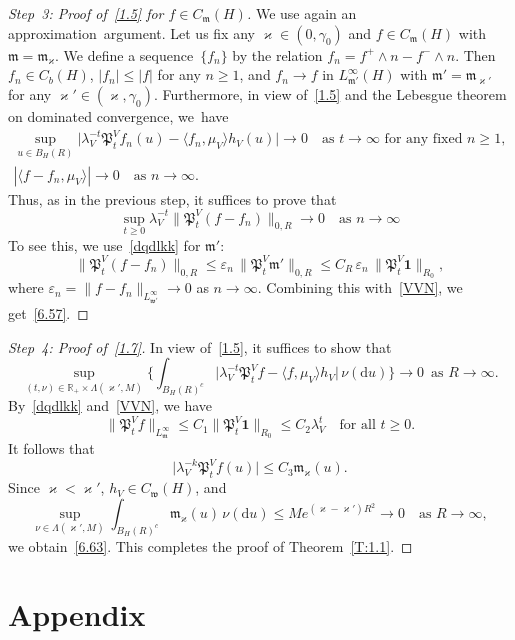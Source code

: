 \documentclass[AHL,Unicode,longabstracts]{cedram}
\newcommand{\e}{\varepsilon}
\newcommand{\mek}{{\mathbf 1}}
\newcommand{\R}{{\mathbb R}}
\newcommand{\vk}{{\varkappa}}
\newcommand{\wwww}{{\mathfrak w}}
\newcommand{\mm}{{\mathfrak m}}
\newcommand{\PPPP}{{\mathfrak P}}
\newcommand{\dd}{\mathrm{d}}
\newenvironment{step}{\begin{proof}}{\let\qed\relax \end{proof}}
\begin{document}
\begin{step}[Step~3: Proof of~\eqref{1.5} for $f\in C_\mm(H)$]
We use again an approximation~argument. Let us fix any $\vk\in(0,\gamma_0)$ and $f\in C_{\mm}(H)$ with $\mm=\mm_\vk$. We define a sequence~$\{f_n\}$ by the relation $f_n=f^+\wedge n-f^-\wedge n$. Then $f_n\in C_b(H)$, $|f_n|\le |f|$ for any $n\ge1$, and $f_n\to f$ in $L_{\mm'}^\infty(H)$ with $\mm'=\mm_{\vk'}$ for any $\vk'\in(\vk,\gamma_0)$. Furthermore, in view of~\eqref{1.5} and the Lebesgue theorem on dominated convergence, we~have
\begin{gather*}
\sup_{u\in B_H(R)}\bigl|\lambda_V^{-t}\PPPP_t^Vf_n(u)-\langle f_n,\mu_V\rangle h_V(u)\bigr| \to0\quad\mbox{as $t\to\infty$ for any fixed $n\ge1$},\\
|\langle f-f_n,\mu_V\rangle|\to0\quad\mbox{as $n\to\infty$}.
\end{gather*}
Thus, as in the previous step, it suffices to prove that
\begin{equation}\label{6.57}
\sup_{t\ge 0}\lambda_V^{-t}\|\PPPP_t^V(f-f_n)\|_{0,R}\to0\quad\mbox{as $n\to\infty$}
\end{equation}
To see this, we use~\eqref{dqdlkk} for $\mm'$:
\[
\|\PPPP_t^V(f-f_n)\|_{0,R}\le \e_n\,\|\PPPP_t^V\mm'\|_{0,R}
\le C_R\,\e_n\, \|\PPPP_t^V{\mek}\|_{R_0},
\]
where $\e_n=\|f-f_n\|_{L_{\wwww'}^\infty}\to0$ as $n\to\infty$. Combining this with~\eqref{VVN}, we get~\eqref{6.57}.
\end{step}

\begin{step}[Step~4: Proof of~\eqref{1.7}]
In view of~\eqref{1.5}, it suffices to show that
\begin{equation}\label{6.63}
\sup_{(t, \nu)\in\R_+\times\Lambda({\vk'},M)}\biggl\{\int_{B_H(R)^c}\bigl|\lambda_V^{-t}\PPPP_t^Vf-\langle f,\mu_V\rangle h_V\bigr|\,\nu(\dd u) \biggr\}\to0\,\,\,
\mbox{as $R\to\infty$}.
\end{equation}
By~\eqref{dqdlkk} and~\eqref{VVN}, we have
\[
\|\PPPP_t^Vf\|_{L_\mm^\infty}\le C_1\|\PPPP_t^V{\mek}\|_{R_0}\le C_2\lambda_V^t\quad\mbox{for all $t\ge0$}.
\]
It follows that
\[
\bigl|\lambda_V^{-k}\PPPP_t^Vf(u)\bigr|\le C_3\mm_\vk(u).
\]
Since $ \vk< \vk'$, $h_V\in C_\wwww(H)$, and
\[
\sup_{\nu\in\Lambda(\vk',M)}\int_{B_H(R)^c} \mm_\vk(u)\,\nu(\dd u)\le M e^{(\vk-\vk')R^2}\to0\quad\mbox{as $R\to\infty$},
\]
we obtain~\eqref{6.63}. This completes the proof of Theorem~\ref{T:1.1}.
\end{step}


\section{Appendix}\label{S:5}
\end{document}
